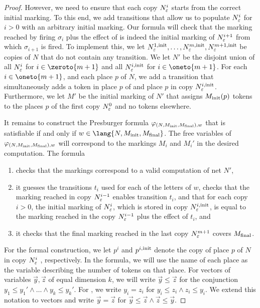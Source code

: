 \documentclass[../../diss.tex]{subfiles}
\begin{document}
\begin{proof}
    However, we need to ensure that each copy $N_\varepsilon^i$ starts from the correct initial marking.
    To this end, we add transitions that allow us to populate $N_\varepsilon^i$ for $i > 0$ with an arbitrary initial marking.
    Our formula will check that the marking reached by firing $\sigma_i$ plus the effect of  is indeed the initial marking of $N_\varepsilon^{i+1}$ from which $\sigma_{i+1}$ is fired.
    To implement this, we let $N_\varepsilon^{1,{\text{init}}}, \ldots, N_\varepsilon^{m,{\text{init}}}, N_\varepsilon^{m+1,{\text{init}}}$ be copies of $N$ that do not contain any transition.
    We let $N'$ be the disjoint union of all $N_\varepsilon^i$ for $i \in \zeroto{m+1}$ and all $N_\varepsilon^{i,{\text{init}}}$ for $i \in \oneto{m+1}$.
    For each $i \in \oneto{m+1}$, and each place $p$ of $N$, we add a transition that simultaneously adds a token in place $p$ of  and place $p$ in copy $N_\varepsilon^{i,{\text{init}}}$.
%
    Furthermore, we let $M'$ be the initial marking of $N'$ that assigns $M_{\text{init}}(p)$ tokens to the places $p$ of the first copy $N_\varepsilon^{0}$ and no tokens elsewhere.

    It remains to construct the Presburger formula $\varphi_{(N,M_{\text{init}},M_{\text{final}}),w}$ that is satisfiable if and only if $w \in \lang{N,\Minit,\Mfinal}$.
    The free variables of $\varphi_{(N,M_{\text{init}},M_{\text{final}}),w}$ will correspond to the markings $M_i$ and $M_i'$ in the desired computation.
    The formula
    \begin{enumerate}[(1)]
        \item checks that the markings correspond to a valid computation of net $N'$,
        \item
            it guesses the transitions $t_i$ used for each of the letters of $w$,
            checks that the marking reached in copy $N_\varepsilon^{i-1}$ enables transition $t_{i}$,
            and that for each copy $i > 0$, the initial marking of $N_\varepsilon^{i}$, which is stored in copy $N_\varepsilon^{i,{\text{init}}}$, is equal to the marking reached in the copy $N_\varepsilon^{i-1}$ plus the effect of $t_i$, and
        \item it checks that the final marking reached in the last copy $N_\varepsilon^{m+1}$ covers $M_{\text{final}}$.
    \end{enumerate}

    For the formal construction, we let $p^i$ and $p^{i,{\text{init}}}$ denote the copy of place $p$ of $N$ in copy $N_\varepsilon^i$ , respectively.
    In the formula, we will use the name of each place as the variable describing the  number of tokens on that place.
    For vectors of variables $\vec{y},\vec{z}$ of equal dimension $k$, we will write $\vec{y} \leq \vec{z}$ for the conjunction $y_1 \leq y_1' \wedge \ldots \wedge y_k \leq y_k'$.
    For , we write $y_i = z_i$ for $y_i \leq z_i \wedge z_i \leq y_i$.
    We extend this notation to vectors and write $\vec{y} = \vec{z}$ for $\vec{y} \leq \vec{z} \wedge \vec{z} \leq \vec{y}$.


\end{proof}
\end{document}
